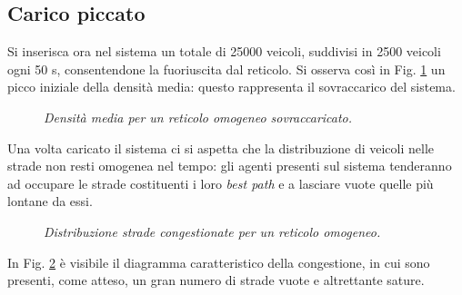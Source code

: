 \documentclass[../main.tex]{subfiles}
\begin{document}
\subsection{Carico piccato}
Si inserisca ora nel sistema un totale di 25000 veicoli, suddivisi in 2500 veicoli ogni 50 s, consentendone la fuoriuscita dal reticolo.
Si osserva cos\`i in Fig. \ref{fig:density_peaked_homo} un picco iniziale della densit\`a media: questo rappresenta il sovraccarico del sistema.
\begin{figure}[H]
    \centering
    \caption[Densit\`a media per un reticolo omogeneo sovraccaricato]{\emph{Densit\`a media per un reticolo omogeneo sovraccaricato.}}
    \label{fig:density_peaked_homo}
\end{figure}
Una volta caricato il sistema ci si aspetta che la distribuzione di veicoli nelle strade non resti omogenea nel tempo: gli agenti presenti sul sistema tenderanno ad occupare le strade costituenti i loro \emph{best path} e a lasciare vuote quelle pi\`u lontane da essi.
\begin{figure}[H]
    \centering
    \caption[Distribuzione strade non congestionate per un reticolo omogeneo.]{\emph{Distribuzione strade congestionate per un reticolo omogeneo.}}
    \label{fig:nStreet_density_peaked_homo}
\end{figure}
In Fig. \ref{fig:nStreet_density_peaked_homo} \`e visibile il diagramma caratteristico della congestione, in cui sono presenti, come atteso, un gran numero di strade vuote e altrettante sature.
\end{document}
